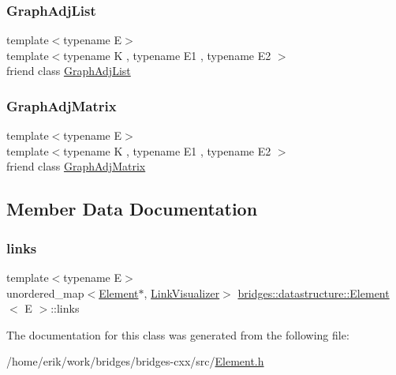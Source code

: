 \subsubsection{\texorpdfstring{Graph\+Adj\+List}{GraphAdjList}}
{\footnotesize\ttfamily template$<$typename E$>$ \\
template$<$typename K , typename E1 , typename E2 $>$ \\
friend class \hyperlink{classbridges_1_1datastructure_1_1_graph_adj_list}{Graph\+Adj\+List}\hspace{0.3cm}{\ttfamily [friend]}}

\mbox{\label{classbridges_1_1datastructure_1_1_element_a1935808473b7eb8ff54149c5436c3ac9}} 
\subsubsection{\texorpdfstring{Graph\+Adj\+Matrix}{GraphAdjMatrix}}
{\footnotesize\ttfamily template$<$typename E$>$ \\
template$<$typename K , typename E1 , typename E2 $>$ \\
friend class \hyperlink{classbridges_1_1datastructure_1_1_graph_adj_matrix}{Graph\+Adj\+Matrix}\hspace{0.3cm}{\ttfamily [friend]}}



\subsection{Member Data Documentation}
\mbox{\label{classbridges_1_1datastructure_1_1_element_ac296ae66e6b04e95f31f4134228524f8}} 
\subsubsection{\texorpdfstring{links}{links}}
{\footnotesize\ttfamily template$<$typename E$>$ \\
unordered\+\_\+map$<$\hyperlink{classbridges_1_1datastructure_1_1_element}{Element}$\ast$, \hyperlink{classbridges_1_1datastructure_1_1_link_visualizer}{Link\+Visualizer}$>$ \hyperlink{classbridges_1_1datastructure_1_1_element}{bridges\+::datastructure\+::\+Element}$<$ E $>$\+::links\hspace{0.3cm}{\ttfamily [protected]}}



The documentation for this class was generated from the following file\+:\begin{DoxyCompactItemize}
\item 
/home/erik/work/bridges/bridges-\/cxx/src/\hyperlink{_element_8h}{Element.\+h}\end{DoxyCompactItemize}
